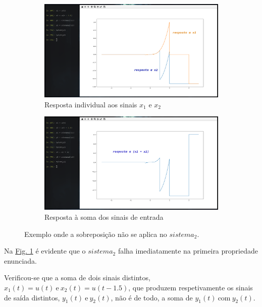 \begin{figure}[ht] 
    \begin{subfigure}[b]{0.5\linewidth}
        \centering
        \includegraphics[width=1\linewidth]{prints/linearidade1.png}
        \caption{Resposta individual aos sinais \(x_1\) e \(x_2\)} 
        \label{fig:a} 
    \end{subfigure}%
    \begin{subfigure}[b]{0.5\linewidth}
        \centering
        \includegraphics[width=1\linewidth]{prints/linearidade2.png} 
        \caption{Resposta à soma dos sinais de entrada} 
        \label{fig:b} 
    \end{subfigure} 
    \caption{Exemplo onde a sobreposição não se aplica no \(sistema_2\).}
    \label{fig:multiplas}
\end{figure}

Na \hyperref[fig:multiplas]{Fig. 1} é evidente que o \(sistema_2\) falha imediatamente na primeira propriedade enunciada.

Verificou-se que a soma de dois sinais distintos, \(x_1(t) = u(t)\ \text{e}\ x_2(t) = u(t-1.5)\), que produzem respetivamente os sinais de saída distintos, \(y_1(t)\ \text{e}\ y_2(t)\), não é de todo, a soma de \(y_1(t)\ \text{com}\ y_2(t)\).

